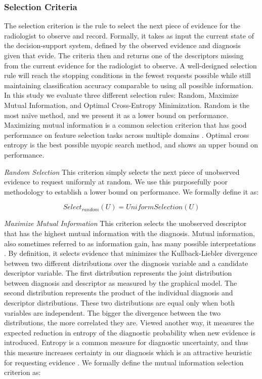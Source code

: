 \subsubsection{Selection Criteria}
The selection criterion is the rule to select the next piece of evidence for the radiologist to observe and record.
Formally, it takes as input the current state of the decision-support system, defined by the observed evidence and diagnosis given that evide.
The criteria then and returns one of the descriptors missing from the current evidence for the radiologist to observe.
A well-designed selection rule will reach the stopping conditions in the fewest requests possible while still maintaining classification accuracy comparable to using all possible information.
In this study we evaluate three different selection rules: Random, Maximize Mutual Information, and Optimal Cross-Entropy Minimization.
Random is the most na\"{i}ve method, and we present it as a lower bound on performance.
Maximizing mutual information is a common selection criterion that has good performance on feature selection tasks across multiple domains \cite{Krause:2005tr}.
Optimal cross entropy is the best possible myopic search method, and shows an upper bound on performance.

\emph{Random Selection}
This criterion simply selects the next piece of unobserved evidence to request uniformly at random.
We use this purposefully poor methodology to establish a lower bound on performance.
We formally define it as:

\begin{equation}
Select_{random}(U) = UniformSelection(U)
\end{equation}


\emph{Maximize Mutual Information}
This criterion selects the unobserved descriptor that has the highest mutual information with the diagnosis.
Mutual information, also sometimes referred to as information gain, has many possible interpretations \cite{Gray:2011hl}.
By definition, it selects evidence that minimizes the Kullback-Liebler divergence between two different distributions over the diagnosis variable and a candidate descriptor variable.
The first distribution represents the joint distribution between diagnosis and descriptor as measured by the graphical model.
The second distribution represents the product of the individual diagnosis and descriptor distributions.
These two distributions are equal only when both variables are independent.
The bigger the divergence between the two distributions, the more correlated they are.
Viewed another way, it measures the expected reduction in entropy of the diagnostic probability when new evidence is introduced.
Entropy is a common measure for diagnostic uncertainty, and thus this measure increases certainty in our diagnosis which is an attractive heuristic for requesting evidence \cite{MacKay:2003wc}.
We formally define the mutual information selection criterion as:

